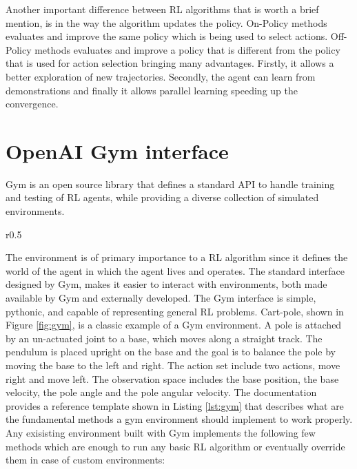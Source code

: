 Another important difference between RL algorithms that is worth a brief mention, is in the way the algorithm updates the policy. On-Policy methods evaluates and improve the same policy which is being used to select actions. Off-Policy methods evaluates and improve a policy that is different from the policy that is used for action selection bringing many advantages. Firstly, it allows a better exploration of new trajectories. Secondly, the agent can learn from demonstrations and finally it allows parallel learning speeding up the convergence.

\section{OpenAI Gym interface}

Gym is an open source library that defines a standard API to handle training and testing of RL agents, while providing a diverse collection of simulated environments.

\begin{wrapfigure}{r}{0.5\textwidth}
  \begin{center}
  \end{center}
  \caption{Cart-pole in Gym}
  \label{fig:gym}
\end{wrapfigure}
The environment is of primary importance to a RL algorithm since it defines the world of the agent in which the agent lives and operates. The standard interface designed by Gym, makes it easier to interact with environments, both made available by Gym and externally developed.
The Gym interface is simple, pythonic, and capable of representing general RL problems. Cart-pole, shown in Figure \ref{fig:gym}, is a classic example of a Gym environment. A pole is attached by an un-actuated joint to a base, which moves along a straight track. The pendulum is placed upright on the base and the goal is to balance the pole by moving the base to the left and right. The action set include two actions, move right and move left. The observation space includes the base position, the base velocity, the pole angle and the pole angular velocity.
The documentation provides a reference template shown in Listing \ref{lst:gym} that describes what are the fundamental methods a gym environment should implement to work properly.
Any exisisting environment built with Gym implements the following few methods which are enough to run any basic RL algorithm or eventually override them in case of custom environments:

